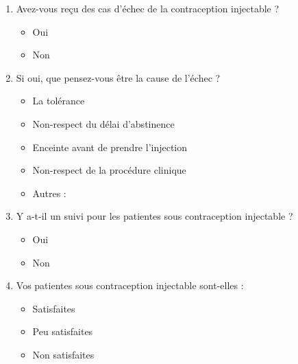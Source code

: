 \begin{enumerate}[label=\arabic*.]
  \item Avez-vous reçu des cas d’échec de la contraception injectable ? 
    \begin{itemize}[label=$\square$]
      \item Oui 
      \item Non 
    \end{itemize}
    \vspace{2em}

  \item Si oui, que pensez-vous être la cause de l’échec ?
    \begin{itemize}[label=$\square$]
      \item La tolérance 
      \item Non-respect du délai d’abstinence 
      \item Enceinte avant de prendre l’injection 
      \item Non-respect de la procédure clinique 
      \item Autres :
    \end{itemize} 
    \vspace{2em}

  \item Y a-t-il un suivi pour les patientes sous contraception injectable ?  
    \begin{itemize}[label=$\square$]
      \item Oui 
      \item Non 
    \end{itemize} 
    \vspace{2em}

  \item	Vos patientes sous contraception \newline injectable sont-elles : 
    \begin{itemize}[label=$\square$]
      \item Satisfaites 
      \item Peu satisfaites 
      \item Non satisfaites
    \end{itemize} 
\end{enumerate}